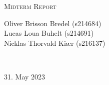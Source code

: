 \begin{titlepage}
\textsc{\Large Midterm Report}\\[1cm]


\begin{minipage}{0.5\textwidth}
        \begin{flushleft}
            \centering
            \large
            
            Oliver Brisson Bredel (s214684) \\[0.2cm]
            Lucas Loua Buhelt (s214691) \\[0.2cm]
            Nicklas Thorvald Kiær (s216137) \\[0.2cm]
        \end{flushleft}
\end{minipage}
\\[1cm]
\vfill \vfill

{\large 31. May 2023}

\vfill

\end{titlepage}